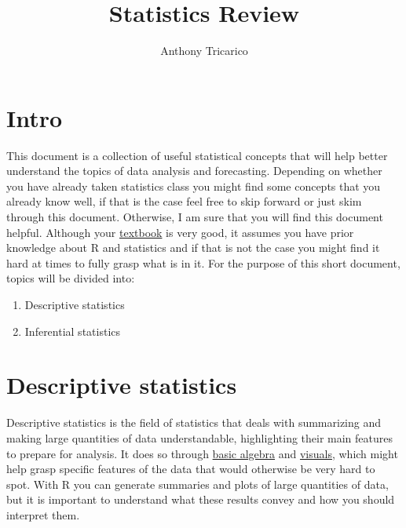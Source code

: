 \documentclass[
  letterpaper,
  DIV=11,
  numbers=noendperiod]{scrartcl}
\title{Statistics Review}
\author{Anthony Tricarico}
\date{}
\providecommand{\tightlist}{%
  \setlength{\itemsep}{0pt}\setlength{\parskip}{0pt}}\usepackage{longtable,booktabs,array}
\renewcommand*\contentsname{Table of contents}
\newcommand\contentsname{Table of contents}
\begin{document}
\maketitle

\renewcommand*\contentsname{Table of contents}
{
\hypersetup{linkcolor=}
\setcounter{tocdepth}{3}
\tableofcontents
}
\section{Intro}\label{intro}

This document is a collection of useful statistical concepts that will
help better understand the topics of data analysis and forecasting.
Depending on whether you have already taken statistics class you might
find some concepts that you already know well, if that is the case feel
free to skip forward or just skim through this document. Otherwise, I am
sure that you will find this document helpful. Although your
\href{https://otexts.com/fpp3/index.html}{textbook} is very good, it
assumes you have prior knowledge about R and statistics and if that is
not the case you might find it hard at times to fully grasp what is in
it. For the purpose of this short document, topics will be divided into:

\begin{enumerate}
\def\labelenumi{\arabic{enumi}.}
\tightlist
\item
  Descriptive statistics
\item
  Inferential statistics
\end{enumerate}

\section{Descriptive statistics}\label{descriptive-statistics}

Descriptive statistics is the field of statistics that deals with
summarizing and making large quantities of data understandable,
highlighting their main features to prepare for analysis. It does so
through \href{https://www.khanacademy.org/math/algebra-basics}{basic
algebra} and
\href{https://towardsdatascience.com/a-comprehensive-guide-to-the-grammar-of-graphics-for-effective-visualization-of-multi-dimensional-1f92b4ed4149}{visuals},
which might help grasp specific features of the data that would
otherwise be very hard to spot. With R you can generate summaries and
plots of large quantities of data, but it is important to understand
what these results convey and how you should interpret them.
\end{document}
